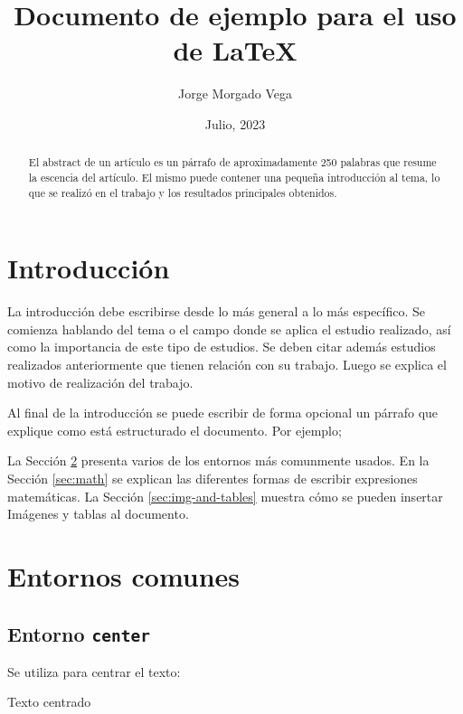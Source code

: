\documentclass[a4paper,12pt]{article}
\begin{document}
\title{Documento de ejemplo para el uso de \LaTeX}
\author{Jorge Morgado Vega}
\date{Julio, 2023}
\maketitle

\begin{abstract}
    El abstract de un artículo es un párrafo de aproximadamente 250 palabras que
    resume la escencia del artículo. El mismo puede contener una pequeña
    introducción al tema, lo que se realizó en el trabajo y los resultados
    principales obtenidos.
\end{abstract}

\section{Introducción}\label{sec:intro}

La introducción debe escribirse desde lo más general a lo más específico.  Se
comienza hablando del tema o el campo donde se aplica el estudio realizado, así
como la importancia de este tipo de estudios. Se deben citar además estudios
realizados anteriormente \cite{hu2016entangled} que tienen relación con su
trabajo. Luego se explica el motivo de realización del trabajo.

Al final de la introducción se puede escribir de forma opcional un párrafo que
explique como está estructurado el documento. Por ejemplo;

La Sección \ref{sec:ent} presenta varios de los entornos más comunmente usados.
En la Sección \ref{sec:math} se explican las diferentes formas de escribir
expresiones matemáticas. La Sección \ref{sec:img-and-tables} muestra cómo se
pueden insertar Imágenes y tablas al documento.

\section{Entornos comunes}\label{sec:ent}

\subsection{Entorno \texttt{center}}\label{sub:center}

Se utiliza para centrar el texto:

\begin{center}
    Texto centrado
\end{center}
\end{document}
